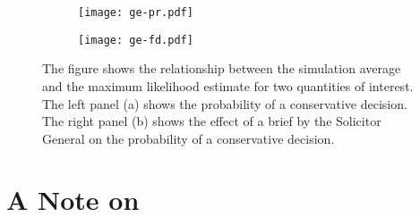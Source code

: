 \documentclass[11pt]{article}
\begin{document}


\begin{figure}[h!]
\begin{subfigure}{.5\textwidth}
  \centering
  \texttt{[image: ge-pr.pdf]}
  \caption{}
  \label{fig:ge1}
\end{subfigure}%
\begin{subfigure}{.5\textwidth}
  \centering
  \texttt{[image: ge-fd.pdf]}
  \caption{}
  \label{fig:ge2}
\end{subfigure}
\caption{The figure shows the relationship between the simulation average and the maximum likelihood estimate for two quantities of interest.
The left panel (a) shows the probability of a conservative decision.
The right panel (b) shows the effect of a brief by the Solicitor General on the probability of a conservative decision.}
\label{fig:ge}
\end{figure}



\section*{A Note on \cite{HanmerKalkan2013}}
\end{document}
